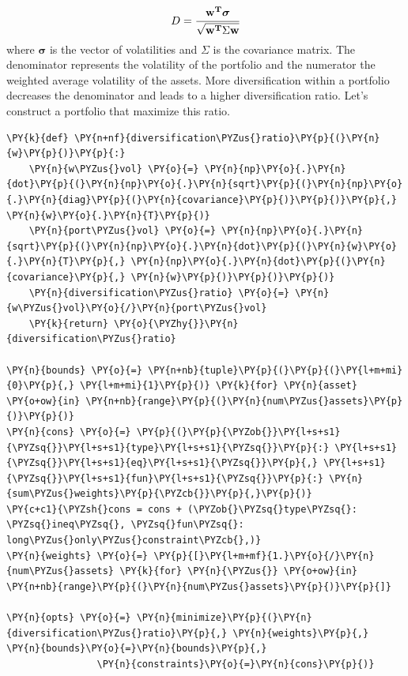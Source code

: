 \begin{equation}
D=\cfrac{\mathbf{w^T}\boldsymbol{\sigma}}{\sqrt {\mathbf{w^T}\Sigma \mathbf{w}}} 
\end{equation}
where $\boldsymbol{\sigma}$ is the vector of volatilities and $\Sigma$ is the covariance matrix. The denominator represents the volatility of the portfolio and the numerator the weighted average volatility of the assets. More diversification within a portfolio decreases the denominator and leads to a higher diversification ratio.
Let's construct a portfolio that maximize this ratio.

\begin{codebox}
\begin{Verbatim}[commandchars=\\\{\}]
\PY{k}{def} \PY{n+nf}{diversification\PYZus{}ratio}\PY{p}{(}\PY{n}{w}\PY{p}{)}\PY{p}{:}
    \PY{n}{w\PYZus{}vol} \PY{o}{=} \PY{n}{np}\PY{o}{.}\PY{n}{dot}\PY{p}{(}\PY{n}{np}\PY{o}{.}\PY{n}{sqrt}\PY{p}{(}\PY{n}{np}\PY{o}{.}\PY{n}{diag}\PY{p}{(}\PY{n}{covariance}\PY{p}{)}\PY{p}{)}\PY{p}{,} \PY{n}{w}\PY{o}{.}\PY{n}{T}\PY{p}{)}
    \PY{n}{port\PYZus{}vol} \PY{o}{=} \PY{n}{np}\PY{o}{.}\PY{n}{sqrt}\PY{p}{(}\PY{n}{np}\PY{o}{.}\PY{n}{dot}\PY{p}{(}\PY{n}{w}\PY{o}{.}\PY{n}{T}\PY{p}{,} \PY{n}{np}\PY{o}{.}\PY{n}{dot}\PY{p}{(}\PY{n}{covariance}\PY{p}{,} \PY{n}{w}\PY{p}{)}\PY{p}{)}\PY{p}{)}
    \PY{n}{diversification\PYZus{}ratio} \PY{o}{=} \PY{n}{w\PYZus{}vol}\PY{o}{/}\PY{n}{port\PYZus{}vol}
    \PY{k}{return} \PY{o}{\PYZhy{}}\PY{n}{diversification\PYZus{}ratio}
	
\PY{n}{bounds} \PY{o}{=} \PY{n+nb}{tuple}\PY{p}{(}\PY{p}{(}\PY{l+m+mi}{0}\PY{p}{,} \PY{l+m+mi}{1}\PY{p}{)} \PY{k}{for} \PY{n}{asset} \PY{o+ow}{in} \PY{n+nb}{range}\PY{p}{(}\PY{n}{num\PYZus{}assets}\PY{p}{)}\PY{p}{)}
\PY{n}{cons} \PY{o}{=} \PY{p}{(}\PY{p}{\PYZob{}}\PY{l+s+s1}{\PYZsq{}}\PY{l+s+s1}{type}\PY{l+s+s1}{\PYZsq{}}\PY{p}{:} \PY{l+s+s1}{\PYZsq{}}\PY{l+s+s1}{eq}\PY{l+s+s1}{\PYZsq{}}\PY{p}{,} \PY{l+s+s1}{\PYZsq{}}\PY{l+s+s1}{fun}\PY{l+s+s1}{\PYZsq{}}\PY{p}{:} \PY{n}{sum\PYZus{}weights}\PY{p}{\PYZcb{}}\PY{p}{,}\PY{p}{)}
\PY{c+c1}{\PYZsh{}cons = cons + (\PYZob{}\PYZsq{}type\PYZsq{}: \PYZsq{}ineq\PYZsq{}, \PYZsq{}fun\PYZsq{}:  long\PYZus{}only\PYZus{}constraint\PYZcb{},)}
\PY{n}{weights} \PY{o}{=} \PY{p}{[}\PY{l+m+mf}{1.}\PY{o}{/}\PY{n}{num\PYZus{}assets} \PY{k}{for} \PY{n}{\PYZus{}} \PY{o+ow}{in} \PY{n+nb}{range}\PY{p}{(}\PY{n}{num\PYZus{}assets}\PY{p}{)}\PY{p}{]}
	
\PY{n}{opts} \PY{o}{=} \PY{n}{minimize}\PY{p}{(}\PY{n}{diversification\PYZus{}ratio}\PY{p}{,} \PY{n}{weights}\PY{p}{,} \PY{n}{bounds}\PY{o}{=}\PY{n}{bounds}\PY{p}{,} 
                \PY{n}{constraints}\PY{o}{=}\PY{n}{cons}\PY{p}{)}
	

\end{Verbatim}
\end{codebox}
